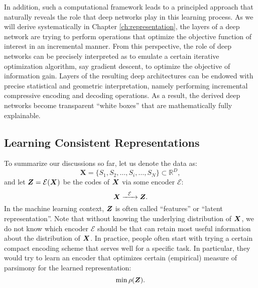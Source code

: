 \documentclass[../../book-main.tex]{subfiles}
\begin{document}
In addition, such a computational framework leads to a principled approach that naturally reveals the role that deep networks play in this learning process. As we will derive systematically in Chapter \ref{ch:representation}, the layers of a deep network are trying to perform operations that optimize the objective function of interest in an incremental manner. From this perspective, the role of deep networks can be precisely interpreted as to emulate a certain iterative optimization algorithm, say gradient descent, to optimize the objective of information gain. Layers of the resulting deep architectures can be endowed with precise statistical and geometric interpretation, namely performing incremental compressive encoding and decoding operations. As a result, the derived deep networks become transparent ``white boxes'' that are mathematically fully explainable.  











\subsection{Learning Consistent Representations}

\label{sec:consistency}
To summarize our discussions so far, let us denote the data as:
\begin{equation}
    \boldsymbol{X} = \{S_1, S_2, \ldots, S_i, \ldots, S_N\} \subset \mathbb{R}^D,
\end{equation}
and let $\boldsymbol{Z} = \mathcal{E}(\bm{X})$ be the codes of $\bm{X}$ via some encoder $\mathcal{E}$:
\begin{equation}
    \bm{X}  \xrightarrow{\hspace{2mm} \mathcal{E}\hspace{2mm}} \bm{Z}.
    \label{eqn:open-loop}
\end{equation}
In the machine learning context, $\bm{Z}$ is often called ``features'' or ``latent representation''. Note that without knowing the underlying distribution of $\bm{X}$, we do not know which encoder $\mathcal{E}$ should be that can retain most useful information about the distribution of $\bm{X}$. In practice, people often start with trying a certain compact encoding scheme that serves well for a specific task. In particular, they would try to learn an encoder that optimizes certain (empirical) measure of parsimony for the learned representation:
\begin{equation}
    \min \rho(\bm{Z}). 
\end{equation}
\end{document}
